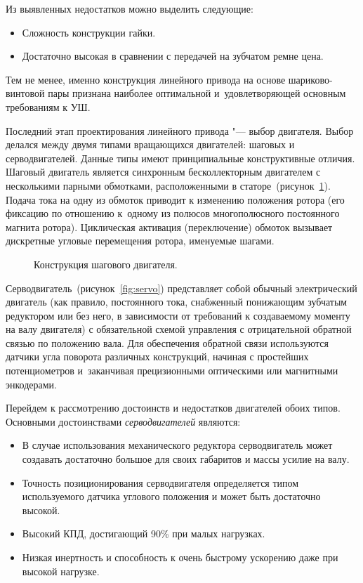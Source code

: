 Из выявленных недостатков можно выделить следующие:

\begin{itemize}
	\item Сложность конструкции гайки.
	
	\item Достаточно высокая в сравнении с передачей на зубчатом ремне цена.
\end{itemize}

Тем не менее, именно конструкция линейного привода на основе шариково-винтовой пары признана наиболее оптимальной и~удовлетворяющей основным требованиям к УШ. 

Последний этап проектирования линейного привода "--- выбор двигателя. Выбор делался между двумя типами вращающихся двигателей: шаговых и серводвигателей. Данные типы имеют принципиальные конструктивные отличия. Шаговый двигатель является синхронным бесколлекторным двигателем с несколькими парными обмотками, расположенными в статоре~(рисунок~\cref{fig:stepper}). Подача тока на одну из обмоток приводит к изменению положения ротора (его фиксацию по отношению к~одному из полюсов многополюсного постоянного магнита ротора). Циклическая активация (переключение) обмоток вызывает дискретные угловые перемещения ротора, именуемые шагами.

\begin{figure}[ht]
	\caption{Конструкция шагового двигателя.}\label{fig:stepper}
\end{figure}

Серводвигатель~(рисунок~\cref{fig:servo}) представляет собой обычный электрический двигатель (как правило, постоянного тока, снабженный понижающим зубчатым редуктором или без него, в зависимости от требований к создаваемому моменту на валу двигателя) с обязательной схемой управления с отрицательной обратной связью по положению вала. Для обеспечения обратной связи используются датчики угла поворота различных конструкций, начиная с простейших потенциометров и~заканчивая прецизионными оптическими или магнитными энкодерами.

Перейдем к рассмотрению достоинств и недостатков двигателей обоих типов. Основными достоинствами \textit{серводвигателей} являются:

\begin{itemize}
	\item В случае использования механического редуктора серводвигатель может создавать достаточно большое для своих габаритов и массы усилие на валу.
	
	\item Точность позиционирования серводвигателя определяется типом используемого датчика углового положения и может быть достаточно высокой.
	
	\item Высокий КПД, достигающий 90\% при малых нагрузках.
	
	\item Низкая инертность и способность к очень быстрому ускорению даже при высокой нагрузке.	
\end{itemize}

